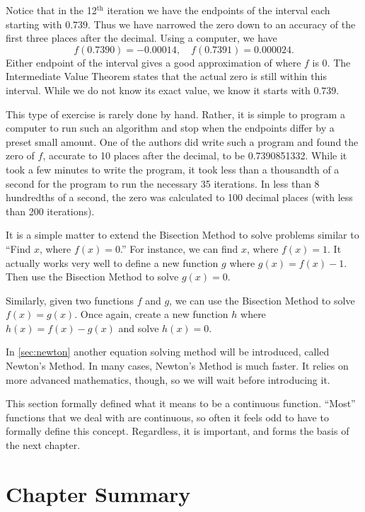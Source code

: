 \begin{example}
Notice that in the 12$^{\text{th}}$ iteration we have the endpoints of the interval each starting with $0.739$. Thus we have narrowed the zero down to an accuracy of the first three places after the decimal. Using a computer, we have 
\[ f(0.7390) = -0.00014, \quad f(0.7391) = 0.000024.\]
Either endpoint of the interval gives a good approximation of where $f$ is 0. The Intermediate Value Theorem states that the actual zero is still within this interval. While we do not know its exact value, we know it starts with $0.739$. 

This type of exercise is rarely done by hand. Rather, it is simple to program a computer to run such an algorithm and stop when the endpoints differ by a preset small amount. One of the authors did write such a program and found the zero of $f$, accurate to 10 places after the decimal, to be 0.7390851332. While it took a few minutes to write the program, it took less than a thousandth of a second for the program to run the necessary 35 iterations. In less than 8 hundredths of a second, the zero was calculated to 100 decimal places (with less than 200 iterations).
\end{example}

It is a simple matter to extend the Bisection Method to solve problems similar to ``Find $x$, where $f(x) = 0$.'' For instance, we can find $x$, where $f(x) = 1$. %
It actually works very well to define a new function $g$ where $g(x) = f(x) - 1$. Then use the Bisection Method to solve $g(x)=0$.  

Similarly, given two functions $f$ and $g$, we can use the Bisection Method to solve $f(x) = g(x)$. Once again, create a new function $h$ where $h(x) = f(x)-g(x)$ and solve $h(x) = 0$. 

In \autoref{sec:newton} another equation solving method will be introduced, called Newton's Method. In many cases, Newton's Method is much faster. It relies on more advanced mathematics, though, so we will wait before introducing it. 

This section formally defined what it means to be a continuous function. ``Most'' functions that we deal with are continuous, so often it feels odd to have to formally define this concept. Regardless, it is important, and forms the basis of the next chapter.


\section*{Chapter Summary}

